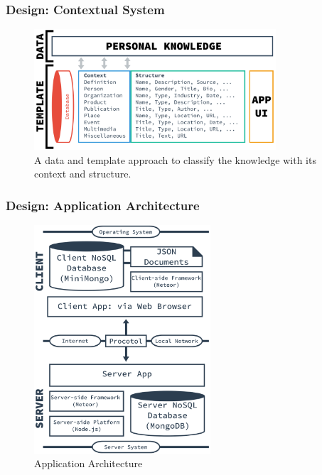\documentclass[10pt, compress]{beamer}
\begin{document}
\begin{frame}[fragile]
  \frametitle{Design: Contextual System}

  \begin{figure}[ht]
    \centering
    \includegraphics[width=9cm]{include/satellid-contextual.png}
    \caption{A data and template approach to classify the knowledge with its context and structure.}
    \label{fig:satellid-contextual}
  \end{figure}

\end{frame}


\begin{frame}[fragile]
  \frametitle{Design: Application Architecture}

  \begin{figure}[ht]
    \centering
    \vspace{-25pt}
    \includegraphics[height=8.5cm]{include/satellid-app-arch.png}
    \vspace{-10pt}
    \caption{Application Architecture}
    \label{fig:satellid-app-arch}
  \end{figure}

\end{frame}
\end{document}
